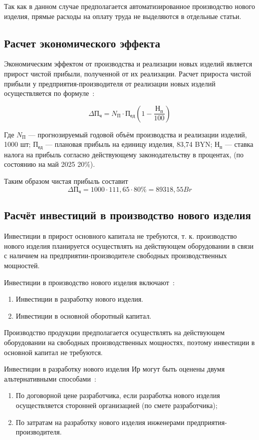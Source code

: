 Так как в данном случае предполагается автоматизированное производство
нового изделия, прямые расходы на оплату труда не выделяются в
отдельные статьи.

\subsection{Расчет экономического эффекта}

Экономическим эффектом от производства и реализации новых изделий
является прирост чистой прибыли, полученной от их реализации.  Расчет
прироста чистой прибыли у предприятия-производителя от реализации
новых изделий осуществляется по
формуле~\cite{bsuir-project-economics}:

\begin{equation}
  \Delta П_ч=N_П \cdot П_{ед} ( 1- \frac{Н_п}{100} )
\end{equation}

Где $N_П$ — прогнозируемый годовой объём производства и реализации изделий, 1000 шт;
$П_{ед}$ — плановая прибыль на единицу изделия, 83,74 BYN;
$Н_п$ — ставка налога на прибыль согласно действующему законодательству в процентах,
(по состоянию на май 2025 20\%).

Таким образом чистая прибыль составит
$$  \Delta П_ч = 1000 \cdot 111,65 \cdot 80\% = 89 318,55Br$$


\subsection{Расчёт инвестиций в производство нового изделия}
Инвестиции в прирост основного капитала не требуются,
т. к. производство нового изделия планируется осуществлять на
действующем оборудовании в связи с наличием на
предприятии-производителе свободных производственных мощностей.

Инвестиции в производство нового изделия включают~\cite{bsuir-project-economics}:
\begin{enumerate}
\item Инвестиции в разработку нового изделия.
\item Инвестиции в основной оборотный капитал.
\end{enumerate}

Производство продукции предполагается осуществлять на действующем
оборудовании на свободных производственных мощностях, поэтому
инвестиции в основной капитал не требуются.


Инвестиции в разработку нового изделия $Ир$ могут быть оценены двумя
альтернативными способами~\cite{bsuir-project-economics}:
\begin{enumerate}
\item По договорной цене разработчика, если разработка нового изделия
  осуществляется сторонней организацией (по смете разработчика);
\item По затратам на разработку нового изделия инженерами
  предприятия-производителя.
\end{enumerate}

